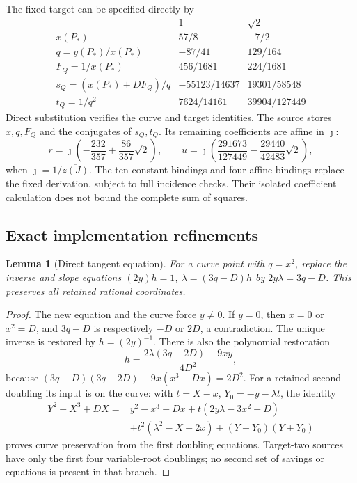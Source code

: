 \documentclass[11pt]{article}
\newtheorem{lemma}[theorem]{Lemma}
\theoremstyle{definition}
\theoremstyle{remark}
\begin{document}
The fixed target can be specified directly by
\[
 \begin{array}{c|cc}
 &1&\sqrt2\\\hline
 x(P_*)&57/8&-7/2\\
 q=y(P_*)/x(P_*)&-87/41&129/164\\
 F_Q=1/x(P_*)&456/1681&224/1681\\
 s_Q=(x(P_*)+DF_Q)/q&-55123/14637&19301/58548\\
 t_Q=1/q^2&7624/14161&39904/127449
 \end{array}
\]
Direct substitution verifies the curve and target identities. The source
stores $x,q,F_Q$ and the conjugates of $s_Q,t_Q$. Its remaining coefficients
are affine in $\jmath$:
\[
 r=\jmath\left(-\frac{232}{357}+\frac{86}{357}\sqrt2\right),\qquad
 u=\jmath\left(\frac{291673}{127449}-\frac{29440}{42483}\sqrt2\right),
\]
when $\jmath=1/\overline{z(J)}$. The ten constant bindings and four
affine bindings replace the fixed derivation, subject to full incidence
checks. Their isolated coefficient calculation does not bound the complete
sum of squares.



\subsection{Exact implementation refinements}


\begin{lemma}[Direct tangent equation]\label{lem:quartic-tangent-fusion}
For a curve point with $q=x^2$, replace the inverse and slope equations
$(2y)h=1$, $\lambda=(3q-D)h$ by
$2y\lambda=3q-D$. This preserves all retained rational coordinates.
\end{lemma}
\begin{proof}
The new equation and the curve force $y\ne0$. If $y=0$, then $x=0$ or
$x^2=D$, and $3q-D$ is respectively $-D$ or $2D$, a contradiction.
The unique inverse is restored by $h=(2y)^{-1}$. There is also the
polynomial restoration
\[
 h=\frac{2\lambda(3q-2D)-9xy}{4D^2},
\]
because $(3q-D)(3q-2D)-9x(x^3-Dx)=2D^2$.
For a retained second doubling its input is on the curve: with
$t=X-x$, $Y_0=-y-\lambda t$, the identity
\begin{align*}
 Y^2-X^3+DX={}&y^2-x^3+Dx+t(2y\lambda-3x^2+D)\\
 &+t^2(\lambda^2-X-2x)+(Y-Y_0)(Y+Y_0)
\end{align*}
proves curve preservation from the first doubling equations. Target-two
sources have only the first four variable-root doublings; no second set
of savings or equations is present in that branch.
\end{proof}
\end{document}
